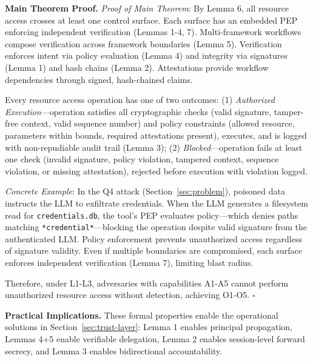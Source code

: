 \noindent\textbf{Main Theorem Proof.} \textit{Proof of Main Theorem}: By Lemma 6, all resource access crosses at least one control surface. Each surface has an embedded PEP enforcing independent verification (Lemmas 1-4, 7). Multi-framework workflows compose verification across framework boundaries (Lemma 5). Verification enforces intent via policy evaluation (Lemma 4) and integrity via signatures (Lemma 1) and hash chains (Lemma 2). Attestations provide workflow dependencies through signed, hash-chained claims.

Every resource access operation has one of two outcomes: (1) \textit{Authorized Execution}—operation satisfies all cryptographic checks (valid signature, tamper-free context, valid sequence number) and policy constraints (allowed resource, parameters within bounds, required attestations present), executes, and is logged with non-repudiable audit trail (Lemma 3); (2) \textit{Blocked}—operation fails at least one check (invalid signature, policy violation, tampered context, sequence violation, or missing attestation), rejected before execution with violation logged.

\textit{Concrete Example}: In the Q4 attack (Section~\ref{sec:problem}), poisoned data instructs the LLM to exfiltrate credentials. When the LLM generates a filesystem read for \texttt{credentials.db}, the tool's PEP evaluates policy—which denies paths matching \texttt{*credential*}—blocking the operation despite valid signature from the authenticated LLM. Policy enforcement prevents unauthorized access regardless of signature validity. Even if multiple boundaries are compromised, each surface enforces independent verification (Lemma 7), limiting blast radius.

Therefore, under L1-L3, adversaries with capabilities A1-A5 cannot perform unauthorized resource access without detection, achieving O1-O5. $\square$

\noindent\textbf{Practical Implications.} These formal properties enable the operational solutions in Section~\ref{sec:trust-layer}: Lemma 1 enables principal propagation, Lemmas 4+5 enable verifiable delegation, Lemma 2 enables session-level forward secrecy, and Lemma 3 enables bidirectional accountability.


